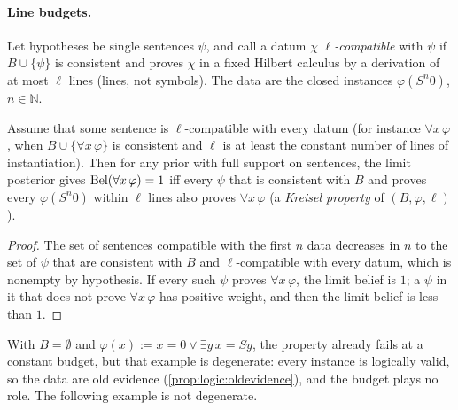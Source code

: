 \paragraph{Line budgets.} Let hypotheses be single sentences $\psi$, and call a datum $\chi$ \emph{$\ell$-compatible} with $\psi$ if $B\cup\{\psi\}$ is consistent and proves $\chi$ in a fixed Hilbert calculus by a derivation of at most $\ell$ lines (lines, not symbols). The data are the closed instances $\varphi(S^n0)$, $n\in\mathbb N$.

\begin{proposition}\label{prop:logic:lines}
Assume that some sentence is $\ell$-compatible with every datum (for instance $\forall x\,\varphi$, when $B\cup\{\forall x\,\varphi\}$ is consistent and $\ell$ is at least the constant number of lines of instantiation). Then for any prior with full support on sentences, the limit posterior gives $\mathrm{Bel}(\forall x\,\varphi)=1$ iff every $\psi$ that is consistent with $B$ and proves every $\varphi(S^n0)$ within $\ell$ lines also proves $\forall x\,\varphi$ (a \emph{Kreisel property} of $(B,\varphi,\ell)$).
\end{proposition}

\begin{proof}
The set of sentences compatible with the first $n$ data decreases in $n$ to the set of $\psi$ that are consistent with $B$ and $\ell$-compatible with every datum, which is nonempty by hypothesis. If every such $\psi$ proves $\forall x\,\varphi$, the limit belief is $1$; a $\psi$ in it that does not prove $\forall x\,\varphi$ has positive weight, and then the limit belief is less than $1$.
\end{proof}

With $B=\emptyset$ and $\varphi(x):=x=0\vee\exists y\,x=Sy$, the property already fails at a constant budget, but that example is degenerate: every instance is logically valid, so the data are old evidence (\cref{prop:logic:oldevidence}), and the budget plays no role. The following example is not degenerate.

